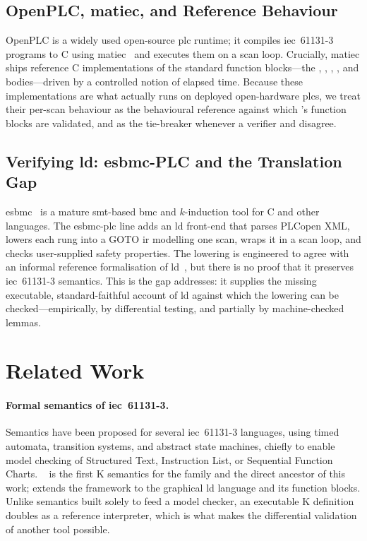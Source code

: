 \subsection{OpenPLC, \texorpdfstring{\gls{matiec}}{MATIEC}, and Reference Behaviour}
\label{sub:openplc}
OpenPLC is a widely used open-source \gls{plc} runtime; it compiles
\gls{iec}~61131-3 programs to C using \gls{matiec}~\cite{deSousa2014} and
executes them on a scan loop. Crucially, \gls{matiec} ships reference C
implementations of the standard function blocks---the , ,
, , and  bodies---driven by a controlled notion of
elapsed time. Because these implementations are what actually runs on deployed
open-hardware \gls{plc}s, we treat their per-scan behaviour as the behavioural
reference against which \kld{}'s function blocks are validated, and as the
tie-breaker whenever a verifier and \kld{} disagree.

\subsection{Verifying \texorpdfstring{\gls{ld}}{LD}: \texorpdfstring{\gls{esbmc}}{ESBMC}-PLC and the Translation Gap}
\label{sub:esbmcplc}
\gls{esbmc}~\cite{gadelha2020} is a mature \gls{smt}-based \gls{bmc} and
$k$-induction tool for C and other languages. The \gls{esbmc}-\gls{plc} line adds
an \gls{ld} front-end that parses PLCopen XML, lowers each rung into a GOTO
\gls{ir} modelling one scan, wraps it in a scan loop, and checks user-supplied
safety properties. The lowering is engineered to agree with an informal reference
formalisation of \gls{ld}~\cite{Ebnenasir2023}, but there is no proof that it
preserves \gls{iec}~61131-3 semantics. This is the gap \kld{} addresses: it
supplies the missing executable, standard-faithful account of \gls{ld} against
which the lowering can be checked---empirically, by differential testing, and
partially by machine-checked lemmas.

\section{Related Work}
\label{sec:related}

\paragraph{Formal semantics of \gls{iec}~61131-3.} Semantics have been proposed
for several \gls{iec}~61131-3 languages, using timed automata, transition systems,
and abstract state machines, chiefly to enable model checking of Structured Text,
Instruction List, or Sequential Function Charts. \kst{}~\cite{Wang2023} is the
first \textsf{K} semantics for the family and the direct ancestor of this work;
\kld{} extends the framework to the graphical \gls{ld} language and its function
blocks. Unlike semantics built solely to feed a model checker, an executable
\textsf{K} definition doubles as a reference interpreter, which is what makes the
differential validation of another tool possible.

